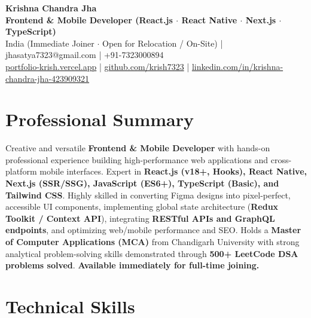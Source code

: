 \documentclass[a4paper,10pt]{article}
\begin{document}
\begin{center}

    {\LARGE \textbf{Krishna Chandra Jha}} \\[2.5pt]

    \textbf{Frontend \& Mobile Developer (React.js $\cdot$ React Native $\cdot$ Next.js $\cdot$ TypeScript)} \\[3.5pt]

    India (Immediate Joiner $\cdot$ Open for Relocation / On-Site)
    \quad | \quad
    jhasatya7323@gmail.com
    \quad | \quad
    +91-7323000894
    \\[2.5pt]

    \href{https://portfolio-ashen-alpha-dv0whhsamo.vercel.app/}{portfolio-krish.vercel.app}
    \quad | \quad
    \href{https://github.com/krish7323}{github.com/krish7323}
    \quad | \quad
    \href{https://linkedin.com/in/krishna-chandra-jha-423909321}
    {linkedin.com/in/krishna-chandra-jha-423909321}

\end{center}

\section*{Professional Summary}

Creative and versatile \textbf{Frontend \& Mobile Developer} with hands-on professional experience building high-performance web applications and cross-platform mobile interfaces. Expert in \textbf{React.js (v18+, Hooks), React Native, Next.js (SSR/SSG), JavaScript (ES6+), TypeScript (Basic), and Tailwind CSS}. Highly skilled in converting Figma designs into pixel-perfect, accessible UI components, implementing global state architecture (\textbf{Redux Toolkit / Context API}), integrating \textbf{RESTful APIs and GraphQL endpoints}, and optimizing web/mobile performance and SEO. Holds a \textbf{Master of Computer Applications (MCA)} from Chandigarh University with strong analytical problem-solving skills demonstrated through \textbf{500+ LeetCode DSA problems solved}. \textbf{Available immediately for full-time joining.}

\section*{Technical Skills}
\end{document}
